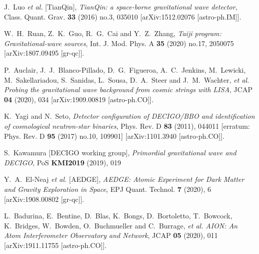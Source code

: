 \documentclass[a4paper,11pt]{article}
\begin{document}
\begin{thebibliography}{99}
J.~Luo \textit{et al.} [TianQin],
{\em TianQin: a space-borne gravitational wave detector},
Class. Quant. Grav. \textbf{33} (2016) no.3, 035010
[arXiv:1512.02076 [astro-ph.IM]].

W.~H.~Ruan, Z.~K.~Guo, R.~G.~Cai and Y.~Z.~Zhang,
{\em Taiji program: Gravitational-wave sources},
Int. J. Mod. Phys. A \textbf{35} (2020) no.17, 2050075
[arXiv:1807.09495 [gr-qc]].

P.~Auclair, J.~J.~Blanco-Pillado, D.~G.~Figueroa, A.~C.~Jenkins, M.~Lewicki, M.~Sakellariadou, S.~Sanidas, L.~Sousa, D.~A.~Steer and J.~M.~Wachter, \textit{et al.}
{\em Probing the gravitational wave background from cosmic strings with LISA},
JCAP \textbf{04} (2020), 034
[arXiv:1909.00819 [astro-ph.CO]].

K.~Yagi and N.~Seto,
{\em Detector configuration of DECIGO/BBO and identification of cosmological neutron-star binaries},
Phys. Rev. D \textbf{83} (2011), 044011
[erratum: Phys. Rev. D \textbf{95} (2017) no.10, 109901]
[arXiv:1101.3940 [astro-ph.CO]].

S.~Kawamura [DECIGO working group],
{\em Primordial gravitational wave and DECIGO},
PoS \textbf{KMI2019} (2019), 019

Y.~A.~El-Neaj \textit{et al.} [AEDGE],
{\em AEDGE: Atomic Experiment for Dark Matter and Gravity Exploration in Space},
EPJ Quant. Technol. \textbf{7} (2020), 6
[arXiv:1908.00802 [gr-qc]].

L.~Badurina, E.~Bentine, D.~Blas, K.~Bongs, D.~Bortoletto, T.~Bowcock, K.~Bridges, W.~Bowden, O.~Buchmueller and C.~Burrage, \textit{et al.}
{\em AION: An Atom Interferometer Observatory and Network},
JCAP \textbf{05} (2020), 011
[arXiv:1911.11755 [astro-ph.CO]].


\end{thebibliography}
\end{document}
